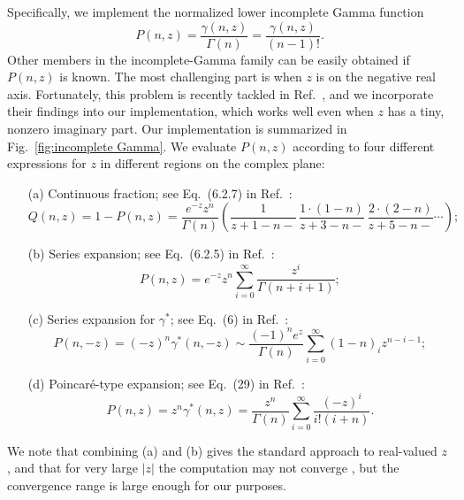 \documentclass[12pt,letter,onecolumn,notitlepage]{article}
\begin{document}
\begin{appendices}
Specifically, we implement the normalized lower incomplete Gamma function \cite{NISThandbook}
\begin{equation}
	P(n, z) = \frac{\gamma(n, z)}{\Gamma(n)}=\frac{\gamma(n,z)}{(n-1)!}.
\end{equation}
Other members in the incomplete-Gamma family can be easily obtained if $P(n,z)$ is known. 
The most challenging part is when $z$ is on the negative real axis. Fortunately, this problem is recently tackled in Ref.~\cite{GilACM17}, and we incorporate their findings into our implementation, which works well even when $z$ has a tiny, nonzero imaginary part. Our implementation is summarized in Fig.~\ref{fig:incomplete Gamma}. We evaluate $P(n,z)$ according to four different expressions for $z$ in different regions on the complex plane:
\begin{enumerate}
	\item[(a)] Continuous fraction; see Eq.~(6.2.7) in Ref.~\cite{NumericalRecipes}:
	\begin{equation}
		Q(n, z) = 1-P(n, z) = \frac{e^{-z}z^n}{\Gamma(n)}\left(\frac{1}{z+1-n-}\,\frac{1\cdot(1-n)}{z+3-n-}\,
		\frac{2\cdot(2-n)}{z+5-n-}\cdots\right);
	\end{equation}
	\item[(b)] Series expansion; see Eq.~(6.2.5) in Ref.~\cite{NumericalRecipes}:
	\begin{equation}
		P(n, z) = e^{-z} z^n \sum_{i=0}^\infty \frac{z^i}{\Gamma(n+i+1)};
	\end{equation}
	\item[(c)] Series expansion for $\gamma^*$; see Eq.~(6) in Ref.~\cite{GilACM17}:
	\begin{equation}
     P(n, -z) = (-z)^n \gamma^*(n, -z)\sim \frac{(-1)^n e^z}{\Gamma(n)} \sum_{i=0}^\infty (1-n)_i z^{n-i-1};
	\end{equation}
	\item[(d)] Poincar\'{e}-type expansion; see Eq.~(29) in Ref.~\cite{GilACM17}:
	\begin{equation}
	P(n, z) = z^n \gamma^*(n, z) = \frac{z^n}{\Gamma(n)} \sum_{i=0}^\infty \frac{(-z)^i}{i!(i+n)}.
	\end{equation}
\end{enumerate}
We note that combining (a) and (b) gives the standard approach to real-valued $z$ \cite{NumericalRecipes}, and that for very large $|z|$ the computation may not converge \cite{GilACM17}, but the convergence range is large enough for our purposes. 



\end{appendices}
\end{document}
